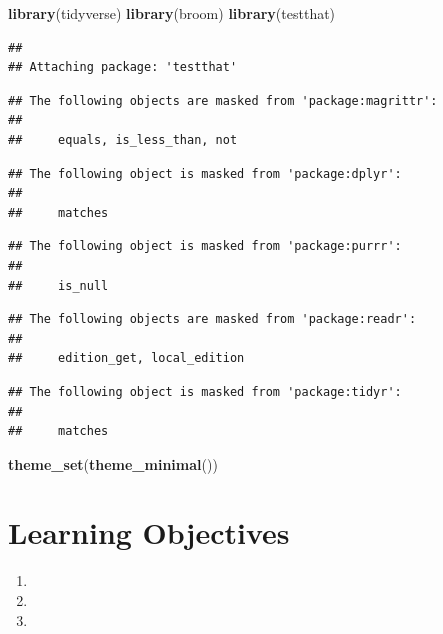 \documentclass[
]{book}
\newenvironment{Shaded}{\begin{snugshade}}{\end{snugshade}}
\newcommand{\FunctionTok}[1]{\textcolor[rgb]{0.13,0.29,0.53}{\textbf{#1}}}
\newcommand{\NormalTok}[1]{#1}
\providecommand{\tightlist}{%
  \setlength{\itemsep}{0pt}\setlength{\parskip}{0pt}}
\theoremstyle{definition}
\theoremstyle{definition}
\theoremstyle{definition}
\theoremstyle{definition}
\theoremstyle{remark}
\begin{document}
\begin{Shaded}
\begin{Highlighting}[]
\FunctionTok{library}\NormalTok{(tidyverse)}
\FunctionTok{library}\NormalTok{(broom)}
\FunctionTok{library}\NormalTok{(testthat)}
\end{Highlighting}
\end{Shaded}

\begin{verbatim}
## 
## Attaching package: 'testthat'
\end{verbatim}

\begin{verbatim}
## The following objects are masked from 'package:magrittr':
## 
##     equals, is_less_than, not
\end{verbatim}

\begin{verbatim}
## The following object is masked from 'package:dplyr':
## 
##     matches
\end{verbatim}

\begin{verbatim}
## The following object is masked from 'package:purrr':
## 
##     is_null
\end{verbatim}

\begin{verbatim}
## The following objects are masked from 'package:readr':
## 
##     edition_get, local_edition
\end{verbatim}

\begin{verbatim}
## The following object is masked from 'package:tidyr':
## 
##     matches
\end{verbatim}

\begin{Shaded}
\begin{Highlighting}[]
\FunctionTok{theme\_set}\NormalTok{(}\FunctionTok{theme\_minimal}\NormalTok{())}
\end{Highlighting}
\end{Shaded}

\hypertarget{learning-objectives-7}{%
\section{Learning Objectives}\label{learning-objectives-7}}

\begin{enumerate}
\def\labelenumi{\arabic{enumi}.}
\tightlist
\item
\item
\item
\end{enumerate}
\end{document}
